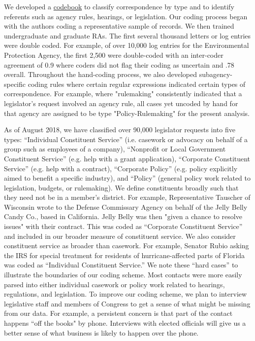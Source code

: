 \documentclass{article}
\begin{document}
We developed a \href{https://docs.google.com/document/d/1fJxjXjAyRL9vX-16fSsH29anXZc-W74GMf_7BSgWkws/edit}{codebook} to classify correspondence by type and to identify referents such as agency rules, hearings, or legislation. Our coding process began with the authors coding a representative sample of records. We then trained undergraduate and graduate RAs. The first several thousand letters or log entries were double coded. For example, of over 10,000 log entries for the Environmental Protection Agency, the first 2,500 were double-coded with an inter-coder agreement of 0.9 where coders did not flag their coding as uncertain and .78 overall. Throughout the hand-coding process, we also developed subagency-specific coding rules where certain regular expressions indicated certain types of correspondence. For example, where "rulemaking" consistently indicated that a legislator's request involved an agency rule, all cases yet uncoded by hand for that agency are assigned to be type "Policy-Rulemaking" for the present analysis. 

As of August 2018, we have classified over 90,000 legislator requests into five types: ``Individual Constituent Service'' (i.e. casework or advocacy on behalf of a group such as employees of a company), ``Nonprofit or Local Government Constituent Service'' (e.g. help with a grant application), ``Corporate Constituent Service'' (e.g. help with a contract), ``Corporate Policy'' (e.g. policy explicitly aimed to benefit a specific industry), and ``Policy'' (general policy work related to legislation, budgets, or rulemaking). 
We define constituents broadly such that they need not be in a member's district. For example, Representative Tauscher of Wisconsin wrote to the Defense Commissary Agency on behalf of the Jelly Belly Candy Co., based in California. Jelly Belly was then "given a chance to resolve issues" with their contract. This was coded as ``Corporate Constituent Service'' and included in our broader measure of constituent service.  We also consider constituent service as broader than casework. For example, Senator Rubio asking the IRS for special treatment for residents of hurricane-affected parts of Florida was coded as ``Individual Constituent Service.'' We note these ``hard cases'' to illustrate the boundaries of our coding scheme. Most contacts were more easily parsed into either individual casework or policy work related to hearings, regulations, and legislation. To improve our coding scheme, we plan to interview legislative staff and members of Congress to get a sense of what might be missing from our data. For example, a persistent concern is that part of the contact happens ``off the books" by phone.  Interviews with elected officials will give us a better sense of what business is likely to happen over the phone.  
\end{document}
